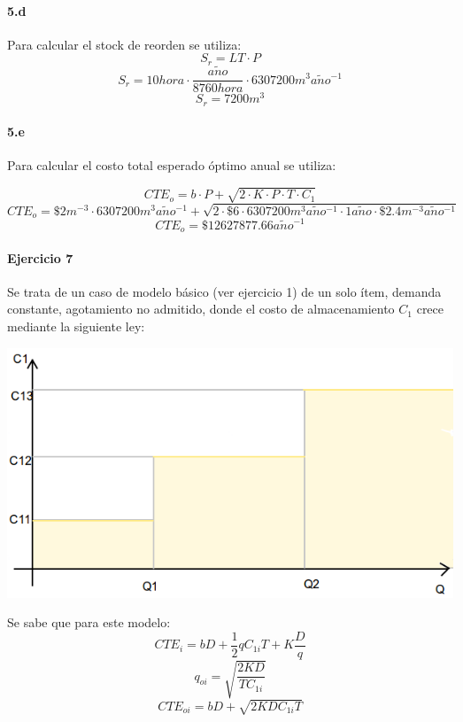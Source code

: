 \documentclass{article}
\def \anio {a\tilde{n}o}
\begin{document}
  \paragraph{5.d}
  Para calcular el stock de reorden se utiliza:
  $$S_r = LT \cdot P $$
  $$S_r = 10 hora \cdot \frac{\anio}{8760 hora} \cdot  6307200 m^3 \anio^{-1} $$
  $$\boxed{S_r = 7200 m^3 }$$
  
  \paragraph{5.e}
  Para calcular el costo total esperado \'optimo anual se utiliza:

  $$CTE_o = b \cdot P + \sqrt{2 \cdot K \cdot P \cdot T \cdot C_1} $$
  $$CTE_o = \$2 m^{-3} \cdot 6307200 m^3 \anio^{-1} + \sqrt{2 \cdot \$6 \cdot 6307200 m^3 \anio^{-1} \cdot 1 \anio \cdot \$2.4 m^{-3}\anio^{-1} }$$
  $$\boxed{CTE_o = \$12627877.66 \anio^{-1}} $$



\pagebreak

\paragraph{Ejercicio 7}
Se trata de un caso de modelo básico (ver ejercicio 1) de un solo ítem, demanda constante, agotamiento no admitido, donde el costo de almacenamiento $C_{1}$ crece mediante la siguiente ley:
\begin{center}
  \includegraphics[scale=0.4,keepaspectratio=true]{img/7/7_QvsC1.png} 
\end{center}
Se sabe que para este modelo:
  \begin{equation}\label{7_CTE}CTE_i = bD + \frac{1}{2}qC_{1i}T + K\frac{D}{q} \end{equation}
  $$ q_{oi} = \sqrt{ \frac{2KD}{TC_{1i}}} $$
  $$ CTE_{oi} = bD + \sqrt{ 2KDC_{1i}T }$$
\end{document}
